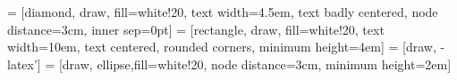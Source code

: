 





\usepackage{pdflscape}

 \usepackage{titlesec}



\usepackage{amsmath}
\usepackage{tikz}
\usetikzlibrary{shapes,arrows}
 = [diamond, draw, fill=white!20, 
    text width=4.5em, text badly centered, node distance=3cm, inner sep=0pt]
 = [rectangle, draw, fill=white!20, 
    text width=10em, text centered, rounded corners, minimum height=4em]
 = [draw, -latex']
 = [draw, ellipse,fill=white!20, node distance=3cm,
    minimum height=2em]
\usetikzlibrary{backgrounds,fit}
\usepackage{pgfplots}
\pgfplotsset{compat=1.15}
\usepackage{mathrsfs}
\usetikzlibrary{arrows}
\usepackage{svg}

\usepackage{fancyhdr,graphicx,amsmath,amssymb}
\usepackage[ruled,vlined,linesnumbered]{algorithm2e}




\newcommand*\numcircledmod[1]{\raisebox{.5pt}{\textcircled{\raisebox{-.9pt} {#1}}}}

\usepackage{minitoc}
\usepackage{amsthm}
\usepackage{graphicx}
\usepackage{fancyhdr}
\usepackage{enumerate}
\usepackage{natbib}
\usepackage{url}
\usepackage{paralist}

\usepackage{blindtext}
\usepackage{amssymb}
\usepackage{makeidx}

